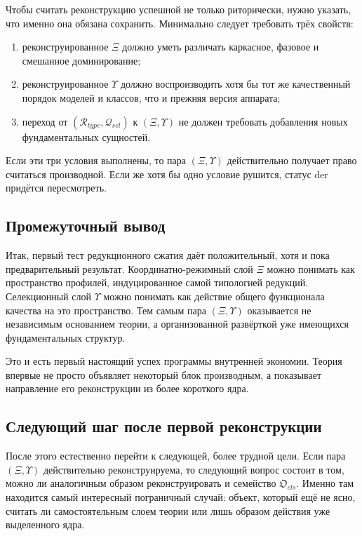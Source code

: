 \documentclass[12pt,a4paper]{article}
\begin{document}
Чтобы считать реконструкцию успешной не только риторически, нужно указать, что именно она обязана сохранить. Минимально следует требовать трёх свойств:
\begin{enumerate}
    \item реконструированное \(\Xi\) должно уметь различать каркасное, фазовое и смешанное доминирование;
    \item реконструированное \(\Upsilon\) должно воспроизводить хотя бы тот же качественный порядок моделей и классов, что и прежняя версия аппарата;
    \item переход от \((\mathcal{R}_{type},\mathcal{Q}_{sel})\) к \((\Xi,\Upsilon)\) не должен требовать добавления новых фундаментальных сущностей.
\end{enumerate}

Если эти три условия выполнены, то пара \((\Xi,\Upsilon)\) действительно получает право считаться производной. Если же хотя бы одно условие рушится, статус \(\mathrm{der}\) придётся пересмотреть.

\subsection{Промежуточный вывод}

Итак, первый тест редукционного сжатия даёт положительный, хотя и пока предварительный результат. Координатно-режимный слой \(\Xi\) можно понимать как пространство профилей, индуцированное самой типологией редукций. Селекционный слой \(\Upsilon\) можно понимать как действие общего функционала качества на это пространство. Тем самым пара \((\Xi,\Upsilon)\) оказывается не независимым основанием теории, а организованной развёрткой уже имеющихся фундаментальных структур.

Это и есть первый настоящий успех программы внутренней экономии. Теория впервые не просто объявляет некоторый блок производным, а показывает направление его реконструкции из более короткого ядра.

\subsection{Следующий шаг после первой реконструкции}

После этого естественно перейти к следующей, более трудной цели. Если пара \((\Xi,\Upsilon)\) действительно реконструируема, то следующий вопрос состоит в том, можно ли аналогичным образом реконструировать и семейство \(\mathfrak{O}_{cls}\). Именно там находится самый интересный пограничный случай: объект, который ещё не ясно, считать ли самостоятельным слоем теории или лишь образом действия уже выделенного ядра.
\end{document}

